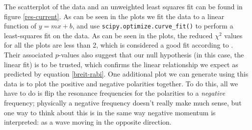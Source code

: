 \documentclass[10pt]{article}
\begin{document}
	The scatterplot of the data and an unweighted least squares fit can be found in
	figure
	\ref{res-current}. As can be seen in the plots we fit the data to a linear
	function of \( y = mx + b \), and use \texttt{scipy.optimize.curve\_fit()} to
	perform a least-squares fit on the data. 
	As can be seen in the plots, the reduced \( \chi^2 \)
	values for all the plots are less than 2, which is considered a good fit
	according to \cite{hughesMeasurementsTheirUncertainties}. 
	Their associated \( p \)-values
	also suggest that our null hypothesis (in this case, the linear fit) is to be
	trusted, which confirms the linear relationship we expect as predicted by
	equation \ref{breit-rabi}. One additional plot we can generate using this data is
	to plot the positive and negative polarities together. To do this, all we have to
	do is flip the resonance frequencies for the polarities to a \textit{negative}
	frequency; physically a negative frequency doesn't really make much sense, 
	but one way to think about this is in the same way negative momentum is
	interpreted: as a wave moving in the opposite direction. 
	
\end{document}
